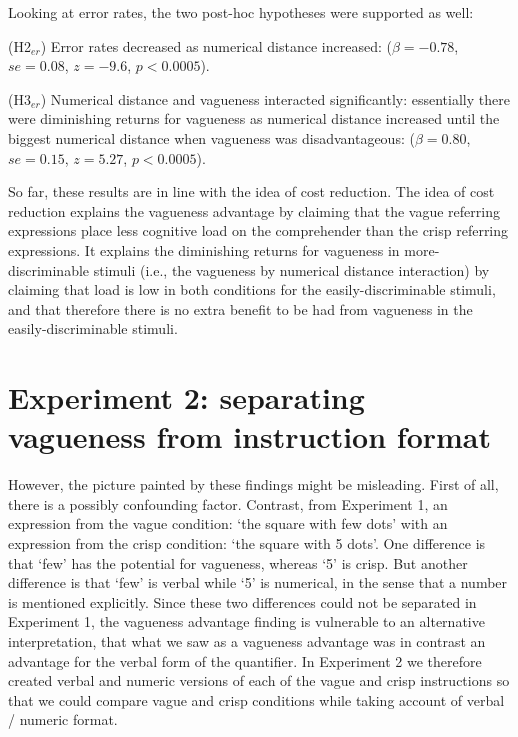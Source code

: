 \documentclass[%
man,		%
floatsintext,%
apacite%
]{apa6}
\begin{document}
Looking at error rates, the two post-hoc hypotheses were supported as well:

{\small
\begin{APAenumerate}
	\item [(H2$_{er}$)] Error rates decreased as numerical distance increased: 
	($\beta=-0.78$, $se=0.08$, $z=-9.6$, $p<0.0005$).%
	\item [(H3$_{er}$)] Numerical distance and vagueness interacted significantly: essentially there were diminishing returns for vagueness as numerical distance increased until the biggest numerical distance when vagueness was disadvantageous: 
	($\beta=0.80$, $se=0.15$, $z=5.27$, $p<0.0005$). %
\end{APAenumerate}
}

So far, these results are in line with the idea of cost reduction. The idea of cost reduction explains the vagueness advantage by claiming that the vague referring expressions place less cognitive load on the comprehender than the crisp referring expressions. It explains the diminishing returns for vagueness in more-discriminable stimuli (i.e., the vagueness by numerical distance interaction) by claiming that load is low in both conditions for the easily-discriminable stimuli, and that therefore there is no extra benefit to be had from vagueness in the easily-discriminable stimuli.


\section{Experiment 2: separating vagueness from instruction format}


However, the picture painted by these findings might be misleading. First of all, there is a possibly confounding factor. Contrast, from Experiment 1, an expression from the vague condition: `the square with few dots' with an expression from the crisp condition: `the square with 5 dots'. 
One difference is that `few' has the potential for vagueness, whereas `5' is crisp. But
another difference is that `few' is verbal while `5' is numerical, in the sense that a number is mentioned explicitly. 
Since these two differences could not be separated in Experiment 1, the vagueness advantage finding is vulnerable to an alternative interpretation, that what we saw as a vagueness advantage was in contrast an advantage for the verbal form of the quantifier. 
In Experiment 2 we therefore created verbal and numeric versions of each of the vague and crisp instructions so that we could compare vague and crisp conditions while taking account of verbal / numeric format.
\end{document}
